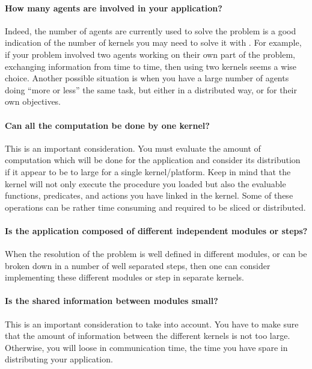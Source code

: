 
\paragraph{How many agents are involved in your application?} Indeed,
the number of agents are currently used to solve the problem is a good
indication of the number of kernels you may need to solve it with
\COPRS{}. For example, if your problem involved two agents working on
their own part of the problem, exchanging information from time to time,
then using two kernels seems a wise choice. Another possible situation is
when you have a large number of agents doing ``more or less'' the same
task, but either in a distributed way, or for their own objectives.

\paragraph{Can all the computation be done by one kernel?} This is an
important consideration. You must evaluate the amount of computation which
will be done for the application and consider its distribution if it
appear to be to large for a single kernel/platform. Keep in mind that
the kernel will not only execute the procedure you loaded but also the
evaluable functions, predicates, and actions you have linked in the
kernel. Some of these operations can be rather time consuming and
required to be sliced or distributed.

\paragraph{Is the application composed of different independent modules
or steps?} When the resolution of the problem is well defined in
different modules, or can be broken down in a number of well separated
steps, then one can consider implementing these different modules or
step in separate kernels.

\paragraph{Is the shared information between modules small?} This is an
important consideration to take into account. You have to make sure that
the amount of information between the different kernels is not too large.
Otherwise, you will loose in communication time, the time you have spare
in distributing your application.

